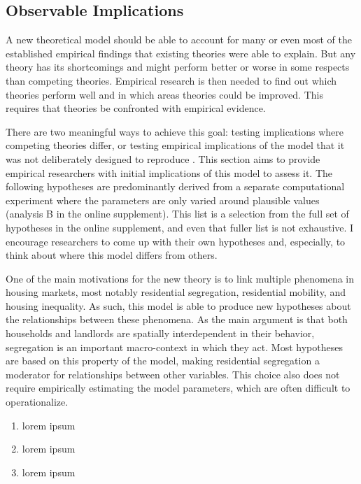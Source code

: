 \subsection{Observable Implications}

A new theoretical model should be able to account for many or even most of the established empirical findings that existing theories were able to explain. But any theory has its shortcomings and might perform better or worse in some respects than competing theories. Empirical research is then needed to find out which theories perform well and in which areas theories could be improved. This requires that theories be confronted with empirical evidence.

There are two meaningful ways to achieve this goal: testing implications where competing theories differ, or testing empirical implications of the model that it was not deliberately designed to reproduce \citep{cohenDevelopingSociologicalKnowledge1989, stinchcombeLogicSocialResearch2005}. This section aims to provide empirical researchers with initial implications of this model to assess it. The following hypotheses are predominantly derived from a separate computational experiment where the parameters are only varied around plausible values (analysis B in the online supplement). This list is a selection from the full set of hypotheses in the online supplement, and even that fuller list is not exhaustive. I encourage researchers to come up with their own hypotheses and, especially, to think about where this model differs from others.

One of the main motivations for the new theory is to link multiple phenomena in housing markets, most notably residential segregation, residential mobility, and housing inequality. As such, this model is able to produce new hypotheses about the relationships between these phenomena. As the main argument is that both households and landlords are spatially interdependent in their behavior, segregation is an important macro-context in which they act. Most hypotheses are based on this property of the model, making residential segregation a moderator for relationships between other variables. This choice also does not require empirically estimating the model parameters, which are often difficult to operationalize.

\begin{enumerate}
	\item lorem ipsum
	\item lorem ipsum
	\item lorem ipsum
\end{enumerate}